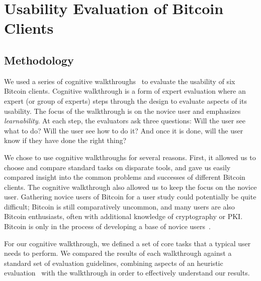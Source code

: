 
\section{Usability Evaluation of Bitcoin Clients}

\subsection{Methodology}

We used a series of cognitive walkthroughs~\cite{WRLP94} to evaluate the usability of six Bitcoin clients. Cognitive walkthrough is a form of expert evaluation where an expert (or group of experts) steps through the design to evaluate aspects of its usability. The focus of the walkthrough is on the novice user and emphasizes \emph{learnability}. At each step, the evaluators ask three questions: Will the user see what to do? Will the user see how to do it? And once it is done, will the user know if they have done the right thing?

We chose to use cognitive walkthroughs for several reasons. First, it allowed us to choose and compare standard tasks on disparate tools, and gave us easily compared insight into the common problems and successes of different Bitcoin clients. The cognitive walkthrough also allowed us to keep the focus on the novice user. Gathering novice users of Bitcoin for a user study could potentially be quite difficult; Bitcoin is still comparatively uncommon, and many users are also Bitcoin enthusiasts, often with additional knowledge of cryptography or PKI. Bitcoin is only in the process of developing a base of novice users~\cite{WhatToCite??}. %


For our cognitive walkthrough, we defined a set of core tasks that a typical user needs to perform. We compared the results of each walkthrough against a standard set of evaluation guidelines, combining aspects of an heuristic evaluation~\cite{HeuristicEvaluation} with the walkthrough in order to effectively understand our results. 

